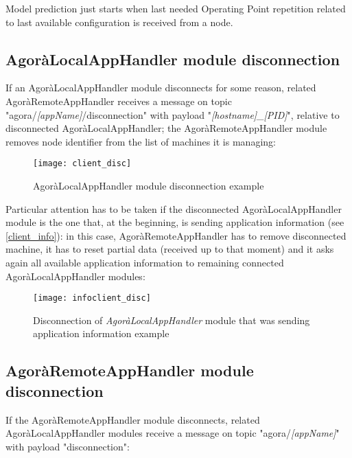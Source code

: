 Model prediction just starts when last needed Operating Point repetition related to last available configuration is received from a node.





\subsection{AgoràLocalAppHandler module disconnection}\label{client_disc}

If an AgoràLocalAppHandler module disconnects for some reason, related Agorà\-Remote\-App\-Handler receives a message on topic "agora\slash{}\textit{[appName]}\slash{}disconnection" with payload "\textit{[hostname]\_[PID]}", relative to disconnected AgoràLocalAppHandler; the AgoràRemote\-App\-Handler module removes node identifier from the list of machines it is managing:

\begin{figure}[H]

    \centering
    \texttt{[image: client\_disc]}
    \caption{AgoràLocalAppHandler module disconnection example}
    
\end{figure}

Particular attention has to be taken if the disconnected AgoràLocalAppHandler module is the one that, at the beginning, is sending application information (see \ref{client_info}): in this case, AgoràRemoteAppHandler has to remove disconnected machine, it has to reset partial data (received up to that moment) and it asks again all available application information to remaining connected AgoràLocalAppHandler modules:

\begin{figure}[H]

    \centering
    \texttt{[image: infoclient\_disc]}
    \caption{Disconnection of \textit{AgoràLocalAppHandler} module that was sending application information example}
    
\end{figure}





\subsection{AgoràRemoteAppHandler module disconnection}\label{handler_disc}

If the AgoràRemoteAppHandler module disconnects, related AgoràLocalAppHandler modules receive a message on topic "agora\slash{}\textit{[appName]}" with payload "disconnection":

